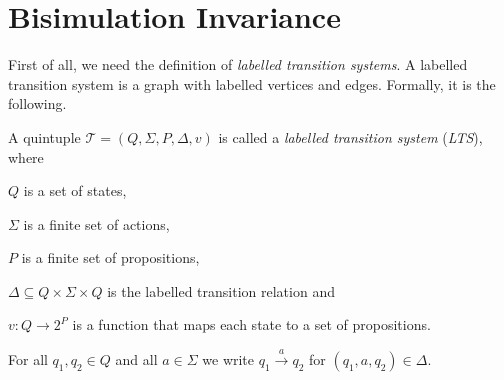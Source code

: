 
\section{Bisimulation Invariance}\label{sec:bisimulationInvariance}

First of all, we need the definition of \textit{labelled transition systems}. A labelled transition system is a graph
with labelled vertices and edges. Formally, it is the following.

\begin{definition}
    \label{definition:lts}
    A quintuple $\mathcal{T} = (Q, \Sigma, P, \Delta, v)$ is called a \emph{labelled transition system} (\emph{LTS}),
    where
    \begin{compactitem}
        \item $Q$ is a set of states,
        \item $\Sigma$ is a finite set of actions,
        \item $P$ is a finite set of propositions,
        \item $\Delta \subseteq Q \times \Sigma \times Q$ is the labelled transition relation and
        \item $v: Q \rightarrow 2^P$ is a function that maps each state to a set of propositions.
    \end{compactitem}
\end{definition}

For all $q_1, q_2 \in Q$ and all $a \in \Sigma$ we write $q_1 \overset{a}{\rightarrow} q_2$ for $(q_1, a, q_2) \in
\Delta$.

